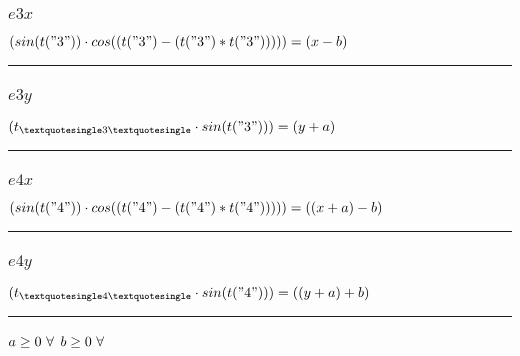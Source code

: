 \documentclass[11pt]{article}
\begin{document}
\subsubsection*{$e3x$}
$
(sin(t("3")) \cdot cos((t("3") - (t("3") * t("3"))))) = (x - b)
$
\vspace{5pt}
\hrule
\subsubsection*{$e3y$}
$
(t_{\textquotesingle 3 \textquotesingle} \cdot sin(t("3"))) = (y + a)
$
\vspace{5pt}
\hrule
\subsubsection*{$e4x$}
$
(sin(t("4")) \cdot cos((t("4") - (t("4") * t("4"))))) = ((x + a) - b)
$
\vspace{5pt}
\hrule
\subsubsection*{$e4y$}
$
(t_{\textquotesingle 4 \textquotesingle} \cdot sin(t("4"))) = ((y + a) + b)
$
\vspace{5pt}
\hrule
\bigskip
$a\geq 0 ~ \forall \\$
$b\geq 0 ~ \forall \\$
\end{document}

